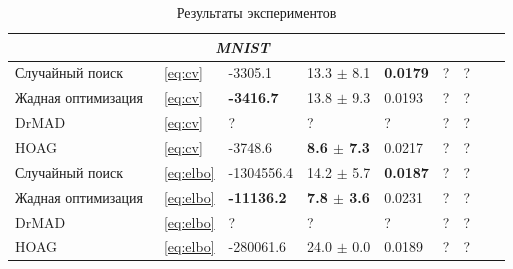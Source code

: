 \documentclass[12pt]{article}
\begin{document}
\begin{table}
\begin{tabularx}{\textwidth}{ |X|X|X|X|X|X|X|X|X|}
\multicolumn{7}{|c|}{\textit{MNIST}}  \\
\hline
Случайный поиск & ~\eqref{eq:cv} & -3305.1  & 13.3 $\pm$ 8.1  &  \bf 0.0179 & ? & ? \\
\hline
Жадная оптимизация & ~\eqref{eq:cv} & \bf -3416.7 & 13.8 $\pm$ 9.3 & 0.0193 & ? & ?\\
\hline
DrMAD & ~\eqref{eq:cv} & ?  &? &  ? & ? & ?\\
\hline
HOAG & ~\eqref{eq:cv} & -3748.6 & \bf 8.6 $\pm$ 7.3&   0.0217 & ? & ? \\
\hline
Случайный поиск & ~\eqref{eq:elbo} & -1304556.4 &  14.2 $\pm$ 5.7 &  \bf 0.0187 & ? & ? \\
\hline
Жадная оптимизация & ~\eqref{eq:elbo} & \bf -11136.2 & \bf 7.8 $\pm$ 3.6  &   0.0231 & ? & ?\\
\hline
DrMAD & ~\eqref{eq:elbo} & ? &   ? & ? & ? & ? \\
\hline
HOAG & ~\eqref{eq:elbo} &  -280061.6 & 24.0 $\pm$ 0.0  &  0.0189 & ? & ?\\
\hline


\hline
\end{tabularx}
\caption{Результаты экспериментов}
\label{table:table}
\end{table}
\end{document}
